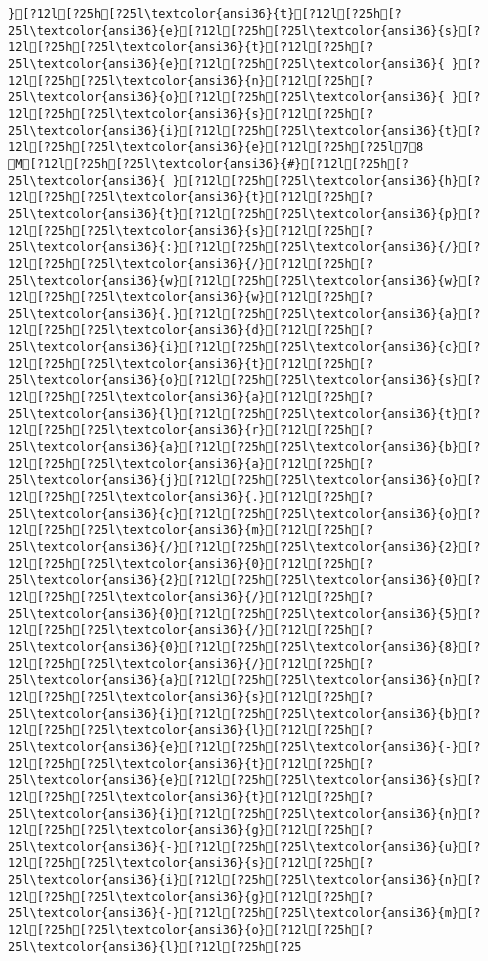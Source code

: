 \documentclass{scrartcl}
\begin{document}
\begin{Verbatim}
}[?12l[?25h[?25l\textcolor{ansi36}{t}[?12l[?25h[?25l\textcolor{ansi36}{e}[?12l[?25h[?25l\textcolor{ansi36}{s}[?12l[?25h[?25l\textcolor{ansi36}{t}[?12l[?25h[?25l\textcolor{ansi36}{e}[?12l[?25h[?25l\textcolor{ansi36}{ }[?12l[?25h[?25l\textcolor{ansi36}{n}[?12l[?25h[?25l\textcolor{ansi36}{o}[?12l[?25h[?25l\textcolor{ansi36}{ }[?12l[?25h[?25l\textcolor{ansi36}{s}[?12l[?25h[?25l\textcolor{ansi36}{i}[?12l[?25h[?25l\textcolor{ansi36}{t}[?12l[?25h[?25l\textcolor{ansi36}{e}[?12l[?25h[?25l78
M[?12l[?25h[?25l\textcolor{ansi36}{#}[?12l[?25h[?25l\textcolor{ansi36}{ }[?12l[?25h[?25l\textcolor{ansi36}{h}[?12l[?25h[?25l\textcolor{ansi36}{t}[?12l[?25h[?25l\textcolor{ansi36}{t}[?12l[?25h[?25l\textcolor{ansi36}{p}[?12l[?25h[?25l\textcolor{ansi36}{s}[?12l[?25h[?25l\textcolor{ansi36}{:}[?12l[?25h[?25l\textcolor{ansi36}{/}[?12l[?25h[?25l\textcolor{ansi36}{/}[?12l[?25h[?25l\textcolor{ansi36}{w}[?12l[?25h[?25l\textcolor{ansi36}{w}[?12l[?25h[?25l\textcolor{ansi36}{w}[?12l[?25h[?25l\textcolor{ansi36}{.}[?12l[?25h[?25l\textcolor{ansi36}{a}[?12l[?25h[?25l\textcolor{ansi36}{d}[?12l[?25h[?25l\textcolor{ansi36}{i}[?12l[?25h[?25l\textcolor{ansi36}{c}[?12l[?25h[?25l\textcolor{ansi36}{t}[?12l[?25h[?25l\textcolor{ansi36}{o}[?12l[?25h[?25l\textcolor{ansi36}{s}[?12l[?25h[?25l\textcolor{ansi36}{a}[?12l[?25h[?25l\textcolor{ansi36}{l}[?12l[?25h[?25l\textcolor{ansi36}{t}[?12l[?25h[?25l\textcolor{ansi36}{r}[?12l[?25h[?25l\textcolor{ansi36}{a}[?12l[?25h[?25l\textcolor{ansi36}{b}[?12l[?25h[?25l\textcolor{ansi36}{a}[?12l[?25h[?25l\textcolor{ansi36}{j}[?12l[?25h[?25l\textcolor{ansi36}{o}[?12l[?25h[?25l\textcolor{ansi36}{.}[?12l[?25h[?25l\textcolor{ansi36}{c}[?12l[?25h[?25l\textcolor{ansi36}{o}[?12l[?25h[?25l\textcolor{ansi36}{m}[?12l[?25h[?25l\textcolor{ansi36}{/}[?12l[?25h[?25l\textcolor{ansi36}{2}[?12l[?25h[?25l\textcolor{ansi36}{0}[?12l[?25h[?25l\textcolor{ansi36}{2}[?12l[?25h[?25l\textcolor{ansi36}{0}[?12l[?25h[?25l\textcolor{ansi36}{/}[?12l[?25h[?25l\textcolor{ansi36}{0}[?12l[?25h[?25l\textcolor{ansi36}{5}[?12l[?25h[?25l\textcolor{ansi36}{/}[?12l[?25h[?25l\textcolor{ansi36}{0}[?12l[?25h[?25l\textcolor{ansi36}{8}[?12l[?25h[?25l\textcolor{ansi36}{/}[?12l[?25h[?25l\textcolor{ansi36}{a}[?12l[?25h[?25l\textcolor{ansi36}{n}[?12l[?25h[?25l\textcolor{ansi36}{s}[?12l[?25h[?25l\textcolor{ansi36}{i}[?12l[?25h[?25l\textcolor{ansi36}{b}[?12l[?25h[?25l\textcolor{ansi36}{l}[?12l[?25h[?25l\textcolor{ansi36}{e}[?12l[?25h[?25l\textcolor{ansi36}{-}[?12l[?25h[?25l\textcolor{ansi36}{t}[?12l[?25h[?25l\textcolor{ansi36}{e}[?12l[?25h[?25l\textcolor{ansi36}{s}[?12l[?25h[?25l\textcolor{ansi36}{t}[?12l[?25h[?25l\textcolor{ansi36}{i}[?12l[?25h[?25l\textcolor{ansi36}{n}[?12l[?25h[?25l\textcolor{ansi36}{g}[?12l[?25h[?25l\textcolor{ansi36}{-}[?12l[?25h[?25l\textcolor{ansi36}{u}[?12l[?25h[?25l\textcolor{ansi36}{s}[?12l[?25h[?25l\textcolor{ansi36}{i}[?12l[?25h[?25l\textcolor{ansi36}{n}[?12l[?25h[?25l\textcolor{ansi36}{g}[?12l[?25h[?25l\textcolor{ansi36}{-}[?12l[?25h[?25l\textcolor{ansi36}{m}[?12l[?25h[?25l\textcolor{ansi36}{o}[?12l[?25h[?25l\textcolor{ansi36}{l}[?12l[?25h[?25
\end{Verbatim}
\end{document}
